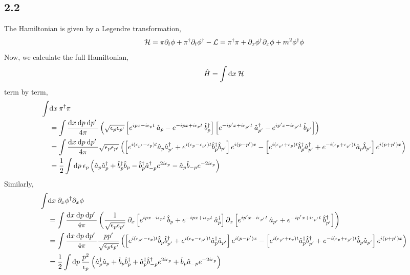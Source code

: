\documentclass[12pt]{extarticle}
\begin{document}
\subsection*{2.2}
The Hamiltonian is given by a Legendre transformation,
\[ \mathcal{H} = \pi \partial_t \phi + \pi^\dagger \partial_t \phi^\dagger - \mathcal{L} = \pi^\dagger \pi + \partial_x \phi^\dagger \partial_x \phi + m^2 \phi^\dagger \phi \]
Now, we calculate the full Hamiltonian,
\[ \hat{H} = \int \mathrm{d}x \: \mathcal{H} \]
term by term,
\begin{align*}
\int & \mathrm{d}x \: \pi^\dagger \pi
\\
& = \int \frac{\mathrm{d}x \: \mathrm{d}p \: \mathrm{d}p' \:}{4 \pi} \left( \sqrt{\epsilon_p \epsilon_{p'}}  \left[ e^{i p x - i \epsilon_p t} \: \hat{a}_p - e^{- i p x + i \epsilon_p t} \: \hat{b}^\dagger_p \right] \left[e^{-i p' x + i \epsilon_{p'} t} \: \hat{a}^\dagger_{p'} - e^{i p' x - i \epsilon_{p'} t} \: \hat{b}_{p'} \right] \right) 
\\ 
& = \int \frac{\mathrm{d}x \: \mathrm{d}p \: \mathrm{d}p' \:}{4 \pi} \sqrt{\epsilon_p \epsilon_{p'}} \left( \left[e^{i (\epsilon_{p'} - \epsilon_p) t} \hat{a}_p \hat{a}^\dagger_{p'} + e^{i (\epsilon_p - \epsilon_{p'}) t} \hat{b}^\dagger_p \hat{b}_{p'} \right] e^{i (p - p') x} -
\left[e^{i (\epsilon_{p'} + \epsilon_p) t} \hat{b}^\dagger_p \hat{a}^\dagger_{p'} + e^{-i (\epsilon_p + \epsilon_{p'}) t} \hat{a}_p \hat{b}_{p'} \right] e^{i (p + p') x} \right)
\\
& = \frac{1}{2} \int \mathrm{d}p \: \epsilon_p \left(\hat{a}_p \hat{a}^\dagger_{p} + \hat{b}^\dagger_p \hat{b}_{p} -
\hat{b}^\dagger_p \hat{a}^\dagger_{-p} e^{2 i \epsilon_p} - \hat{a}_p \hat{b}_{-p} e^{-2 i \epsilon_p} \right)
\end{align*}
Similarly,
\begin{align*}
\int & \mathrm{d}x \: \partial_x \phi^\dagger \partial_x \phi 
\\
& = \int \frac{\mathrm{d}x \: \mathrm{d}p \: \mathrm{d}p' \:}{4 \pi} \left( \frac{1}{\sqrt{\epsilon_p \epsilon_{p'}}} \: \partial_x \left[ e^{i p x - i \epsilon_p t} \: \hat{b}_p + e^{- i p x + i \epsilon_p t} \: \hat{a}^\dagger_p \right] \partial_x \left[e^{i p' x - i \epsilon_{p'} t} \: \hat{a}_{p'} + e^{- i p' x + i \epsilon_{p'} t} \: \hat{b}^\dagger_{p'} \right]   \right) 
\\ 
& = \int \frac{\mathrm{d}x \: \mathrm{d}p \: \mathrm{d}p' \:}{4 \pi} \frac{p p'}{\sqrt{\epsilon_p \epsilon_{p'}}}  \left( \left[e^{i (\epsilon_{p'} - \epsilon_p) t} \hat{b}_p \hat{b}^\dagger_{p'} + e^{i (\epsilon_p - \epsilon_{p'}) t} \hat{a}^\dagger_p \hat{a}_{p'} \right] e^{i (p - p') x} -
\left[e^{i (\epsilon_{p'} + \epsilon_p) t} \hat{a}^\dagger_p \hat{b}^\dagger_{p'} + e^{-i (\epsilon_p + \epsilon_{p'}) t} \hat{b}_p \hat{a}_{p'} \right] e^{i (p + p') x} \right)
\\
& = \frac{1}{2} \int \mathrm{d}p \: \frac{p^2}{\epsilon_p} \left(\hat{a}^\dagger_p \hat{a}_{p} + \hat{b}_p \hat{b}^\dagger_{p} +
\hat{a}^\dagger_p \hat{b}^\dagger_{-p} e^{2 i \epsilon_p} + \hat{b}_p \hat{a}_{-p} e^{-2 i \epsilon_p} \right)
\end{align*}
\end{document}
